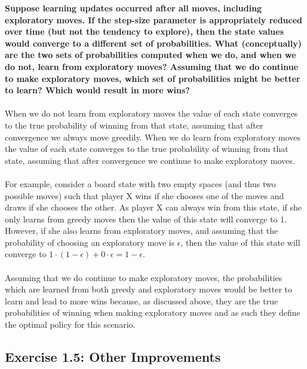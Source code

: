 \documentclass[a4paper,11pt]{article}
\numberwithin{equation}{section}
\theoremstyle{remark}
\begin{document}
\textbf{Suppose learning updates occurred after all moves, including exploratory moves. If the step-size parameter is appropriately reduced over time (but not the tendency to explore), then the state values would converge to a different set of probabilities. What (conceptually) are the two sets of probabilities computed when we do, and when we do not, learn from exploratory moves? Assuming that we do continue to make exploratory moves, which set of probabilities might be better to learn? Which would result in more wins?}
\\ \\
When we do not learn from exploratory moves the value of each state converges to the true probability of winning from that state, assuming that after convergence we always move greedily. When we do learn from exploratory moves the value of each state converges to the true probability of winning from that state, assuming that after convergence we continue to make exploratory moves.
\\ \\
For example, consider a board state with two empty spaces (and thus two possible moves) such that player X wins if she chooses one of the moves and draws if she chooses the other. As player X can always win from this state, if she only learns from greedy moves then the value of this state will converge to 1. However, if she also learns from exploratory moves, and assuming that the probability of choosing an exploratory move is $\epsilon$, then the value of this state will converge to $1 \cdot (1-\epsilon) + 0 \cdot \epsilon = 1-\epsilon$. 
\\ \\
Assuming that we do continue to make exploratory moves, the probabilities which are learned from both greedy and exploratory moves would be better to learn and lead to more wins because, as discussed above, they are the true probabilities of winning when making exploratory moves and as such they define the optimal policy for this scenario.

\subsection{Exercise 1.5: Other Improvements}
\end{document}
